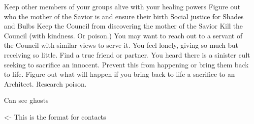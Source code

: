 \documentclass[char]{Silversiders}
\begin{document}
\name{\cCaregiver{}}

Keep other members of your groups alive with your healing powers
Figure out who the mother of the Savior is and ensure their birth
Social justice for Shades and Bulbs
Keep the Council from discovering the mother of the Savior
Kill the Council (with kindness. Or poison.) You may want to reach out to a servant of the Council with similar views to serve it.
You feel lonely, giving so much but receiving so little. Find a true friend or partner.
You heard there is a sinister cult seeking to sacrifice an innocent. Prevent this from happening or bring them back to life.
Figure out what will happen if you bring back to life a sacrifice to an Architect.
Research poison.

Can see ghosts

\begin{itemz}[Goals]
	\item 
\end{itemz}

\begin{itemz}[Notes]
	\item 
\end{itemz}

\begin{contacts}
	\contact{\cTest{}} <- This is the format for contacts 
\end{contacts}
\end{document}
